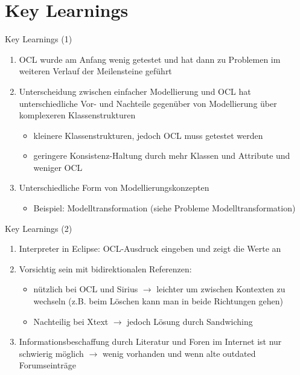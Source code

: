 \section{Key Learnings}
\begin{frame}{Key Learnings (1)}
	\begin{enumerate}
		\item OCL wurde am Anfang wenig getestet und hat dann zu Problemen im weiteren Verlauf der Meilensteine geführt
		\item Unterscheidung zwischen einfacher Modellierung und OCL hat unterschiedliche Vor- und Nachteile gegenüber von Modellierung über komplexeren Klassenstrukturen
		\begin{itemize}
			\item kleinere Klassenstrukturen, jedoch OCL muss getestet werden
			\item geringere Konsistenz-Haltung durch mehr Klassen und Attribute und weniger OCL
		\end{itemize}
		\item Unterschiedliche Form von Modellierungskonzepten
		\begin{itemize}
			\item Beispiel: Modelltransformation (siehe Probleme Modelltransformation)
		\end{itemize}
	\end{enumerate}
\end{frame}

\begin{frame}{Key Learnings (2)}
	\begin{enumerate}
		\item Interpreter in Eclipse: OCL-Ausdruck eingeben und zeigt die Werte an
		\item Vorsichtig sein mit bidirektionalen Referenzen:
		\begin{itemize}
			\item nützlich bei OCL und Sirius $\rightarrow$ leichter um zwischen Kontexten zu wechseln (z.B. beim Löschen kann man in beide Richtungen gehen)
			\item Nachteilig bei Xtext $\rightarrow$ jedoch Lösung durch Sandwiching
		\end{itemize}
		\item Informationsbeschaffung durch Literatur und Foren im Internet ist nur schwierig möglich $\rightarrow$ wenig vorhanden und wenn alte outdated Forumseinträge
	\end{enumerate}
\end{frame}
